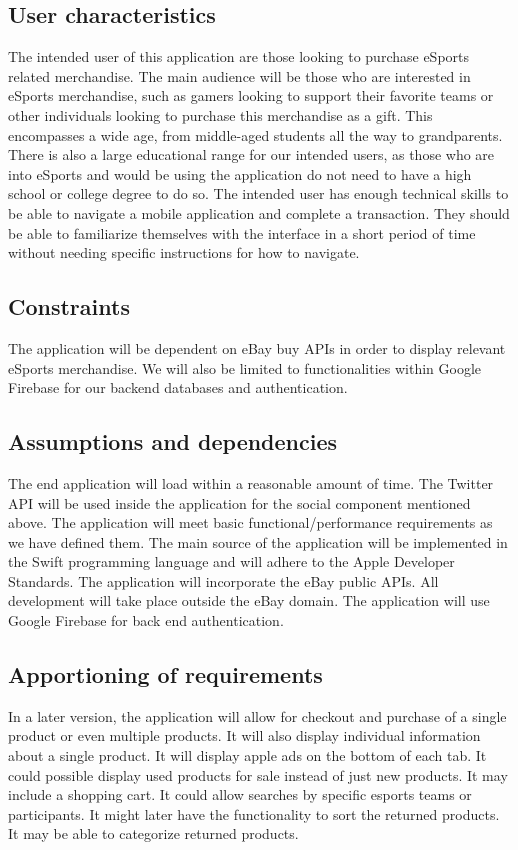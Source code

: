 \documentclass[onecolumn, draftclsnofoot,10pt, compsoc]{IEEEtran}
\begin{document}
\subsection{User characteristics}
The intended user of this application are those looking to purchase eSports related merchandise. The main audience will be those who are interested in eSports merchandise, such as gamers looking to support their favorite teams or other individuals looking to purchase this merchandise as a gift. This encompasses a wide age, from middle-aged students all the way to grandparents. There is also a large educational range for our intended users, as those who are into eSports and would be using the application do not need to have a high school or college degree to do so. The intended user has enough technical skills to be able to navigate a mobile application and complete a transaction. They should be able to familiarize themselves with the interface in a short period of time without needing specific instructions for how to navigate.

\subsection{Constraints}
The application will be dependent on eBay buy APIs in order to display relevant eSports merchandise. We will also be limited to functionalities within Google Firebase for our backend databases and authentication. 

\subsection{Assumptions and dependencies}
The end application will load within a reasonable amount of time. The Twitter API will be used inside the application for the social component mentioned above. The application will meet basic functional/performance requirements as we have defined them. The main source of the application will be implemented in the Swift programming language and will adhere to the Apple Developer Standards. The application will incorporate the eBay public APIs. All development will take place outside the eBay domain. The application will use Google Firebase for back end authentication. 

\subsection{Apportioning of requirements}
In a later version, the application will allow for checkout and purchase of a single product or even multiple products. It will also display individual information about a single product. It will display apple ads on the bottom of each tab. It could possible display used products for sale instead of just new products. It may include a shopping cart. It could allow searches by specific esports teams or participants. It might later have the functionality to sort the returned products. It may be able to categorize returned products.
\end{document}
